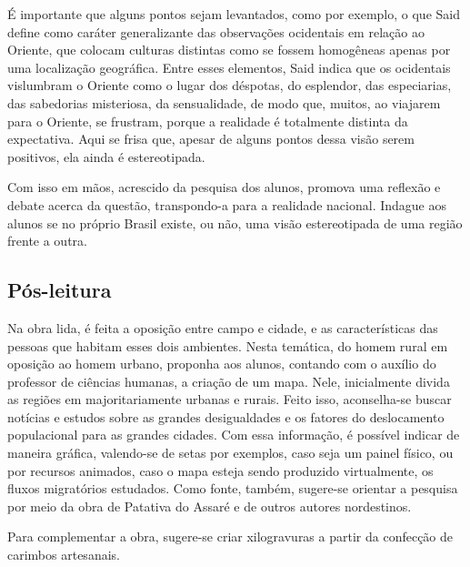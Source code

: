 \documentclass[12pt]{extarticle}
\begin{document}
É importante que alguns pontos sejam levantados, como por exemplo, o que
Said define como caráter generalizante das observações ocidentais em
relação ao Oriente, que colocam culturas distintas como se fossem
homogêneas apenas por uma localização geográfica. Entre esses elementos,
Said indica que os ocidentais vislumbram o Oriente como o lugar dos
déspotas, do esplendor, das especiarias, das sabedorias misteriosa, da
sensualidade, de modo que, muitos, ao viajarem para o Oriente, se
frustram, porque a realidade é totalmente distinta da expectativa. Aqui
se frisa que, apesar de alguns pontos dessa visão serem positivos, ela
ainda é estereotipada.

Com isso em mãos, acrescido da pesquisa dos alunos, promova uma reflexão
e debate acerca da questão, transpondo-a para a realidade nacional.
Indague aos alunos se no próprio Brasil existe, ou não, uma visão
estereotipada de uma região frente a outra.


\subsection{Pós-leitura}

Na obra lida, é feita a oposição entre campo e cidade, e as
características das pessoas que habitam esses dois ambientes. Nesta
temática, do homem rural em oposição ao homem urbano, proponha aos
alunos, contando com o auxílio do professor de ciências humanas, a
criação de um mapa. Nele, inicialmente divida as regiões em
majoritariamente urbanas e rurais. Feito isso, aconselha-se buscar
notícias e estudos sobre as grandes desigualdades e os fatores do
deslocamento populacional para as grandes cidades. Com essa informação,
é possível indicar de maneira gráfica, valendo-se de setas por exemplos,
caso seja um painel físico, ou por recursos animados, caso o mapa esteja
sendo produzido virtualmente, os fluxos migratórios estudados. Como
fonte, também, sugere-se orientar a pesquisa por meio da obra de
Patativa do Assaré e de outros autores nordestinos.


Para complementar a obra, sugere-se criar xilogravuras a partir da
confecção de carimbos artesanais.

\end{document}

